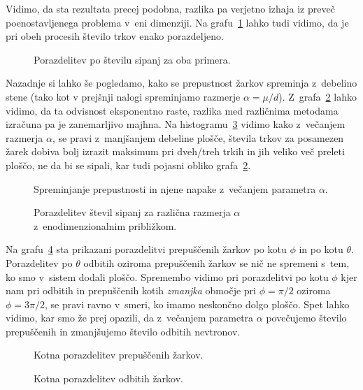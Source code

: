\documentclass[a4paper,pdftex,10pt]{article}
\numberwithin{figure}{section} %
\begin{document}
Vidimo, da sta rezultata precej podobna, razlika pa verjetno izhaja iz preveč 
poenostavljenega problema v~eni dimenziji. Na grafu~\ref{slika8} lahko tudi vidimo, da 
je pri obeh procesih število trkov enako porazdeljeno.
\begin{figure}    
    \centering
    \resizebox{0.75\linewidth}{!}{}
    \caption{Porazdelitev po številu sipanj za oba primera.}
    \label{slika8}
\end{figure}
Nazadnje si lahko še pogledamo, kako se prepustnost žarkov spreminja z~debelino stene
(tako kot v prejšnji nalogi spreminjamo razmerje $\alpha = \mu/d$). Z~grafa~\ref{slika9}
lahko vidimo, da ta odvisnost eksponentno raste, razlika med različnima metodama izračuna
pa je zanemarljivo majhna. Na histogramu~\ref{slika10} vidimo kako z~večanjem razmerja
$\alpha$, se pravi z~manjšanjem debeline plošče, števila trkov za posamezen žarek 
dobiva bolj izrazit maksimum pri dveh/treh trkih in jih veliko več preleti ploščo,
ne da bi se sipali, kar tudi pojasni obliko grafa~\ref{slika9}.\\
\begin{figure}    
    \centering
    \resizebox{0.75\linewidth}{!}{}
    \caption{Spreminjanje prepustnosti in njene napake z~večanjem parametra $\alpha$.}
    \label{slika9}
\end{figure}
\begin{figure}    
    \centering
    \resizebox{0.75\linewidth}{!}{}
    \caption{Porazdelitev števil sipanj za različna razmerja $\alpha$ z~enodimenzionalnim
    približkom.}
    \label{slika10}
\end{figure}
Na grafu~\ref{slika11} sta prikazani porazdelitvi prepuščenih žarkov po kotu $\phi$ in
po kotu $\theta$. Porazdelitev po $\theta$ odbitih oziroma prepuščenih žarkov se nič
ne spremeni s~tem, ko smo v~sistem dodali ploščo. Spremembo vidimo pri porazdelitvi
po kotu $\phi$ kjer nam pri odbitih in prepuščenih kotih \emph{zmanjka} območje 
pri $\phi= \pi/2$ oziroma $\phi=3\pi/2$, se pravi ravno v~smeri, ko imamo neskončno
dolgo ploščo. Spet lahko vidimo, kar smo že prej opazili, da z~večanjem parametra 
$\alpha$ povečujemo število prepuščenih in zmanjšujemo število odbitih nevtronov.


\begin{figure}    
    \centering
    \resizebox{0.45\linewidth}{!}{}
    \resizebox{0.45\linewidth}{!}{}
    \caption{Kotna porazdelitev prepuščenih žarkov.}
    \label{slika11}
\end{figure}

\begin{figure}    
    \centering
    \resizebox{0.45\linewidth}{!}{}
    \resizebox{0.45\linewidth}{!}{}
    \caption{Kotna porazdelitev odbitih žarkov.}
    \label{slika12}
\end{figure}
\end{document}
